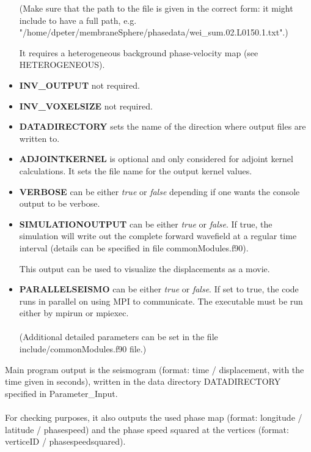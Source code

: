 \documentclass[a4paper,
                          headsepline,
                          listof=totoc,
                          toc=listof,
                          headings=small]{scrreprt} %
\begin{document}
\begin{itemize}
(Make sure that the path to the file is given in the correct form: it might include to have a full path, e.g.\\
"/home/dpeter/membraneSphere/phasedata/wei\_sum.02.L0150.1.txt".)


It requires a heterogeneous background phase-velocity map 
(see HETEROGENEOUS). 
 

\item \textbf{INV\_OUTPUT} 
not required.

\item \textbf{INV\_VOXELSIZE} 
not required.

\item \textbf{DATADIRECTORY} 
sets the name of the direction where output files are written to.

\item \textbf{ADJOINTKERNEL} 
is optional and only considered for adjoint kernel calculations. It sets the file name
for the output kernel values.

\item \textbf{VERBOSE} 
can be either \textit{true} or \textit{false} depending if one wants the console output to be verbose.

\item \textbf{SIMULATIONOUTPUT} 
can be either \textit{true} or \textit{false}. If true, the simulation will write out the 
complete forward wavefield at a regular time
interval (details can be specified in file commonModules.f90). 

This output can be used to visualize the displacements as a movie.

\item \textbf{PARALLELSEISMO} 
can be either \textit{true} or \textit{false}. If set to true, the code runs in parallel on using MPI
to communicate. The executable must be run either by mpirun or mpiexec.
\\
\\
(Additional detailed parameters can be set
in the file include/commonModules.f90 file.)

\end{itemize}


Main program output is the seismogram (format: time / displacement, with the
time given in seconds),
written in the data directory DATADIRECTORY specified in Parameter\_Input. 
\\
\\
For checking purposes, it also outputs the used phase map 
(format: longitude / latitude / phasespeed)
and the phase speed squared at the vertices 
(format: verticeID / phasespeedsquared).
    
\end{document}
